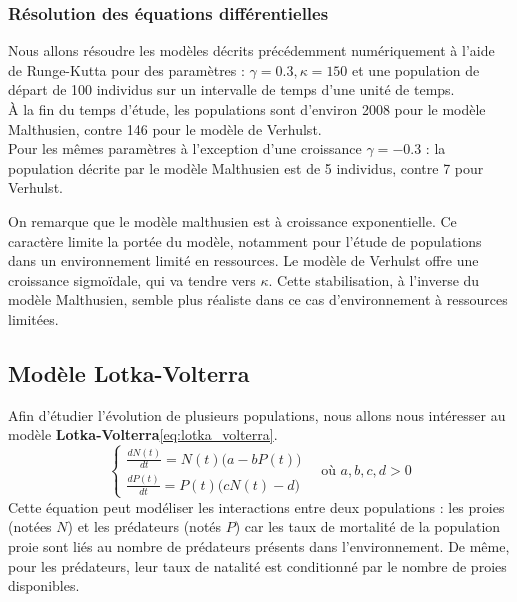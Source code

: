 \subsubsection{Résolution des équations différentielles}
Nous allons résoudre les modèles décrits précédemment numériquement à l'aide de Runge-Kutta pour des paramètres : $\gamma = 0.3, \kappa = 150$ et une population de départ de 100 individus sur un intervalle de temps d'une unité de temps.\\
À la fin du temps d'étude, les populations sont d'environ 2008 pour le modèle Malthusien, contre 146 pour le modèle de Verhulst.
\\
Pour les mêmes paramètres à l'exception d'une croissance $\gamma = -0.3$ : la population décrite par le modèle Malthusien est de 5 individus, contre 7 pour Verhulst.
%
%

On remarque que le modèle malthusien est à croissance exponentielle. Ce caractère limite la portée du modèle, notamment pour l'étude de populations dans un environnement limité en ressources.
Le modèle de Verhulst offre une croissance sigmoïdale, qui va tendre vers $\kappa$. Cette stabilisation, à l'inverse du modèle Malthusien, semble plus réaliste dans ce cas d'environnement à ressources limitées.

\subsection{Modèle Lotka-Volterra}
Afin d'étudier l'évolution de plusieurs populations, nous allons nous intéresser au modèle \textbf{Lotka-Volterra}\ref{eq:lotka_volterra}.
\begin{equation}
\begin{cases}
\displaystyle \frac{dN(t)}{dt} = N(t)\big(a - bP(t)\big) \\
\displaystyle \frac{dP(t)}{dt} = P(t)\big(cN(t) - d\big)
\end{cases}
\quad \text{où } a, b, c, d > 0
\label{eq:lotka_volterra}
\end{equation}
Cette équation peut modéliser les interactions entre deux populations : les proies (notées $N$) et les prédateurs (notés $P$) car les taux de mortalité de la population proie sont liés au nombre de prédateurs présents dans l'environnement.
De même, pour les prédateurs, leur taux de natalité est conditionné par le nombre de proies disponibles.\\

